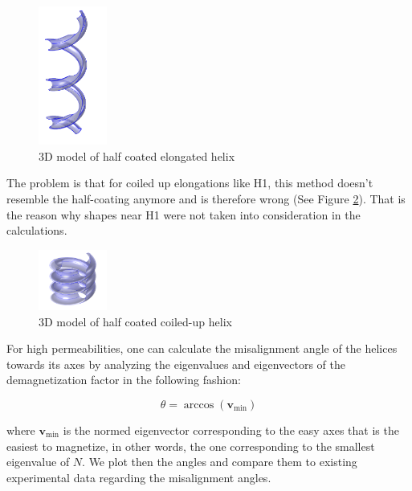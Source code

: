 \begin{figure}[ht]
	\centering
  \includegraphics[width=0.2\textwidth]{Pictures/halfcoated.png}
	\caption{3D model of half coated elongated helix}
	\label{fig:halfcoated}
\end{figure}

The problem is that for coiled up elongations like H1, this method doesn't resemble the half-coating anymore and is therefore wrong (See Figure \ref{fig:halfcoatedcoiled}). That is the reason why shapes near H1 were not taken into consideration in the calculations.\\

\begin{figure}[ht]
	\centering
  \includegraphics[width=0.2\textwidth]{Pictures/halfcoatedcoiled.png}
	\caption{3D model of half coated coiled-up helix}
	\label{fig:halfcoatedcoiled}
\end{figure}

For high permeabilities, one can calculate the misalignment angle of the helices towards its axes by analyzing the eigenvalues and eigenvectors of the demagnetization factor in the following fashion:

\begin{equation}
\theta = \arccos(\textbf{v}_\text{min})
\end{equation}

where $\textbf{v}_\text{min} $ is the normed eigenvector corresponding to the easy axes that is the easiest to magnetize, in other words, the one corresponding to the smallest eigenvalue of $N$. We plot then the angles and compare them to existing experimental data regarding the misalignment angles.\\

